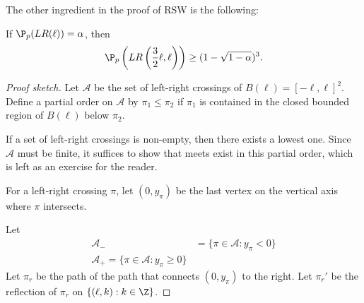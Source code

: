 \documentclass[a4paper]{article}
\begin{document}
The other ingredient in the proof of RSW is the following:
\begin{lemma}
  If $\P_p(LR(\ell)) = \alpha$, then
  \[
    \P_p\left(LR\left(\frac{3}{2}\ell, \ell\right)\right) \geq (1 - \sqrt{1 - \alpha})^3.
  \]
\end{lemma}

\begin{proof}[Proof sketch]
  Let $\mathcal{A}$ be the set of left-right crossings of $B(\ell) = [-\ell, \ell]^2$. Define a partial order on $\mathcal{A}$ by $\pi_1 \leq \pi_2$ if $\pi_1$ is contained in the closed bounded region of $B(\ell)$ below $\pi_2$.

  If a set of left-right crossings is non-empty, then there exists a lowest one. Since $\mathcal{A}$ must be finite, it suffices to show that meets exist in this partial order, which is left as an exercise for the reader.

  For a left-right crossing $\pi$, let $(0, y_\pi)$ be the last vertex on the vertical axis where $\pi$ intersects.
  \begin{center}
  \end{center}
  Let %
  \begin{align*}
    \mathcal{A}_- &= \{\pi \in \mathcal{A}: y_\pi < 0\}\\
    \mathcal{A}_+ = \{\pi \in \mathcal{A}: y_\pi \geq 0\}
  \end{align*}
  Let $\pi_r$ be the path of the path that connects $(0, y_\pi)$ to the right. Let $\pi_r'$ be the reflection of $\pi_r$ on $\{(\ell, k): k \in \Z\}$.


\end{proof}
\end{document}
